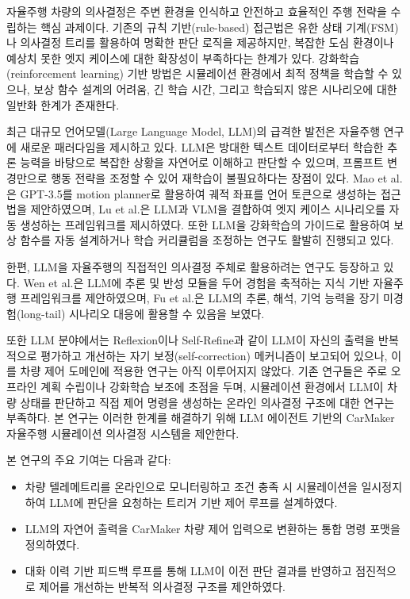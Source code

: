 \documentclass[final,5p,times,twocolumn,9pt]{elsarticle}
\begin{document}
자율주행 차량의 의사결정은 주변 환경을 인식하고 안전하고 효율적인 주행 전략을 수립하는 핵심 과제이다. 기존의 규칙 기반(rule-based) 접근법은 유한 상태 기계(FSM)나 의사결정 트리를 활용하여 명확한 판단 로직을 제공하지만, 복잡한 도심 환경이나 예상치 못한 엣지 케이스에 대한 확장성이 부족하다는 한계가 있다. 강화학습(reinforcement learning) 기반 방법은 시뮬레이션 환경에서 최적 정책을 학습할 수 있으나, 보상 함수 설계의 어려움, 긴 학습 시간, 그리고 학습되지 않은 시나리오에 대한 일반화 한계가 존재한다\cite{pang2026large, ryu2025curricullm}.

최근 대규모 언어모델(Large Language Model, LLM)의 급격한 발전은 자율주행 연구에 새로운 패러다임을 제시하고 있다. LLM은 방대한 텍스트 데이터로부터 학습한 추론 능력을 바탕으로 복잡한 상황을 자연어로 이해하고 판단할 수 있으며, 프롬프트 변경만으로 행동 전략을 조정할 수 있어 재학습이 불필요하다는 장점이 있다. Mao et al.\cite{mao2023gpt}은 GPT-3.5를 motion planner로 활용하여 궤적 좌표를 언어 토큰으로 생성하는 접근법을 제안하였으며, Lu et al.\cite{lu2025omnitester}은 LLM과 VLM을 결합하여 엣지 케이스 시나리오를 자동 생성하는 프레임워크를 제시하였다. 또한 LLM을 강화학습의 가이드로 활용하여 보상 함수를 자동 설계하거나 학습 커리큘럼을 조정하는 연구도 활발히 진행되고 있다\cite{liang2024eurekaverse, pang2026large, ryu2025curricullm}.

한편, LLM을 자율주행의 직접적인 의사결정 주체로 활용하려는 연구도 등장하고 있다. Wen et al.\cite{wen2023dilu}은 LLM에 추론 및 반성 모듈을 두어 경험을 축적하는 지식 기반 자율주행 프레임워크를 제안하였으며, Fu et al.\cite{fu2024drive}은 LLM의 추론, 해석, 기억 능력을 장기 미경험(long-tail) 시나리오 대응에 활용할 수 있음을 보였다.

또한 LLM 분야에서는 Reflexion\cite{shinn2023reflexion}이나 Self-Refine\cite{madaan2023self}과 같이 LLM이 자신의 출력을 반복적으로 평가하고 개선하는 자기 보정(self-correction) 메커니즘이 보고되어 있으나, 이를 차량 제어 도메인에 적용한 연구는 아직 이루어지지 않았다. 기존 연구들은 주로 오프라인 계획 수립이나 강화학습 보조에 초점을 두며, 시뮬레이션 환경에서 LLM이 차량 상태를 판단하고 직접 제어 명령을 생성하는 온라인 의사결정 구조에 대한 연구는 부족하다. 본 연구는 이러한 한계를 해결하기 위해 LLM 에이전트 기반의 CarMaker 자율주행 시뮬레이션 의사결정 시스템을 제안한다.

본 연구의 주요 기여는 다음과 같다:
\begin{itemize}
\item 차량 텔레메트리를 온라인으로 모니터링하고 조건 충족 시 시뮬레이션을 일시정지하여 LLM에 판단을 요청하는 트리거 기반 제어 루프를 설계하였다.
\item LLM의 자연어 출력을 CarMaker 차량 제어 입력으로 변환하는 통합 명령 포맷을 정의하였다.
\item 대화 이력 기반 피드백 루프를 통해 LLM이 이전 판단 결과를 반영하고 점진적으로 제어를 개선하는 반복적 의사결정 구조를 제안하였다.
\end{itemize}
\end{document}
